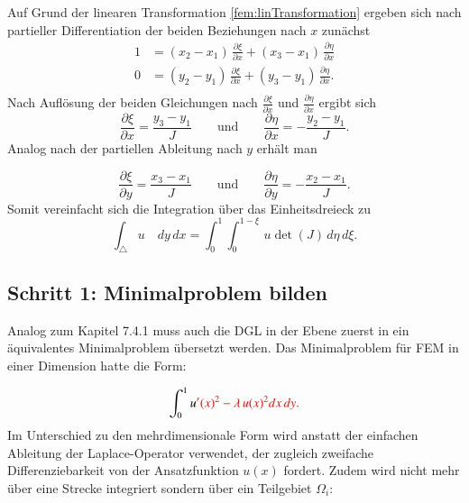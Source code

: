 Auf Grund der linearen Transformation \eqref{fem:linTransformation}
ergeben sich nach partieller Differentiation der beiden Beziehungen
nach $x$ zunächst
\begin{equation}
\begin{aligned}
1  &= (x_2 -x_1) \, \frac{\partial \xi}{\partial x} + (x_3 -x_1) \, \frac{\partial \eta}{\partial x} \\
0 &= (y_2 -y_1) \, \frac{\partial \xi}{\partial x} + (y_3 -y_1) \, \frac{\partial \eta}{\partial x}.\\
 \end{aligned}
\end{equation}
Nach Auflösung  der beiden Gleichungen nach
$\displaystyle\frac{\partial \xi}{\partial x}$ und
$\displaystyle\frac{\partial \eta}{\partial x}$
ergibt sich
\begin{equation}
\frac{\partial \xi}{\partial x} = \frac{y_3 - y_1}{J}
\qquad \text{und}\qquad
\frac{\partial \eta}{\partial x} = -\frac{y_2 - y_1}{J}.
\end{equation}
Analog nach der partiellen Ableitung nach $y$ erhält man

\begin{equation}
\frac{\partial \xi}{\partial y} = \frac{x_3 - x_1}{J}
\qquad \text{und}\qquad
\frac{\partial \eta}{\partial y} = -\frac{x_2 - x_1}{J}.
\end{equation}
Somit vereinfacht sich die Integration über das Einheitsdreieck zu
\begin{equation}
			\int_{\triangle} u \quad dy \, dx = \int_0^1 \int_0^{1 - \xi} \, u \det (J) \, d \eta \, d \xi.
\end{equation}

\subsection{Schritt 1: Minimalproblem bilden}

Analog zum Kapitel 7.4.1 muss auch die DGL in der Ebene zuerst in
ein äquivalentes Minimalproblem übersetzt werden.
Das Minimalproblem für FEM in einer Dimension hatte die Form:

\begin{equation}
			\int_0^1 u \color{red}{'} (x)^2 - \lambda \, u(x)^2 dx \,dy.
			\label{fem:Minimal1D}
\end{equation}
Im Unterschied zu den mehrdimensionale Form wird anstatt der einfachen
Ableitung der Laplace-Operator verwendet, der zugleich zweifache
Differenziebarkeit von der Ansatzfunktion $u(x)$ fordert.
Zudem wird nicht mehr über eine Strecke integriert sondern über ein
Teilgebiet $\Omega_i$:

